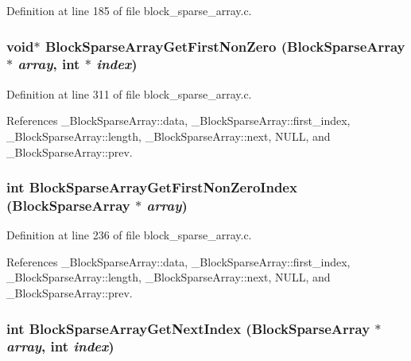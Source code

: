 Definition at line 185 of file block\_\-sparse\_\-array.c.
\subsubsection{\setlength{\rightskip}{0pt plus 5cm}void$\ast$ Block\-Sparse\-Array\-Get\-First\-Non\-Zero (\bf{Block\-Sparse\-Array} $\ast$ {\em array}, int $\ast$ {\em index})}\label{block__sparse__array_8h_19a09bd1a8a10ecb044eb709c4758329}




Definition at line 311 of file block\_\-sparse\_\-array.c.

References \_\-Block\-Sparse\-Array::data, \_\-Block\-Sparse\-Array::first\_\-index, \_\-Block\-Sparse\-Array::length, \_\-Block\-Sparse\-Array::next, NULL, and \_\-Block\-Sparse\-Array::prev.
\subsubsection{\setlength{\rightskip}{0pt plus 5cm}int Block\-Sparse\-Array\-Get\-First\-Non\-Zero\-Index (\bf{Block\-Sparse\-Array} $\ast$ {\em array})}\label{block__sparse__array_8h_f411bba4c8aad6b1feff3fe14c860bf9}




Definition at line 236 of file block\_\-sparse\_\-array.c.

References \_\-Block\-Sparse\-Array::data, \_\-Block\-Sparse\-Array::first\_\-index, \_\-Block\-Sparse\-Array::length, \_\-Block\-Sparse\-Array::next, NULL, and \_\-Block\-Sparse\-Array::prev.
\subsubsection{\setlength{\rightskip}{0pt plus 5cm}int Block\-Sparse\-Array\-Get\-Next\-Index (\bf{Block\-Sparse\-Array} $\ast$ {\em array}, int {\em index})}\label{block__sparse__array_8h_e8d38d30d99d06ccbc76c978f2325646}




